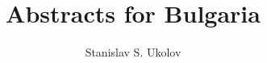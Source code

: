 \documentclass[12pt]{article}
\begin{document}
\title{Abstracts for Bulgaria}
\author{Stanislav S. Ukolov}
\maketitle



\end{document}
